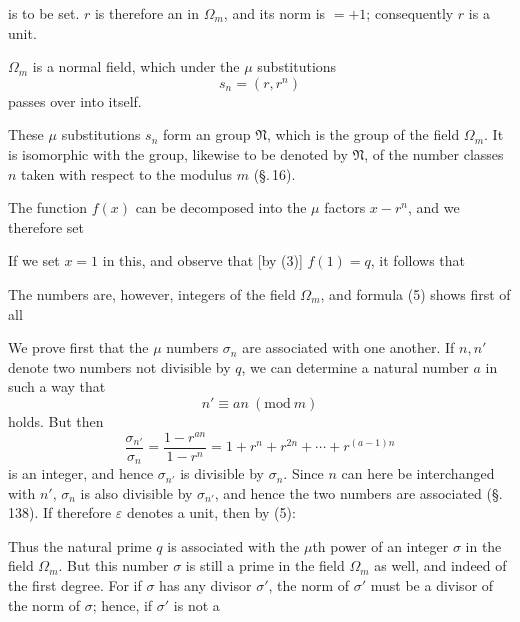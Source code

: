 is to be set. $r$ is therefore an  in $\Omega_m$, and its norm is $=+1$; consequently $r$ is a unit.

$\Omega_m$ is a normal field, which under the $\mu$ substitutions
\[ s_n = (r, r^n) \]
passes over into itself.

These $\mu$ substitutions $s_n$ form an  group $\mathfrak{N}$, which is the  group of the field $\Omega_m$. It is isomorphic with the group, likewise to be denoted by $\mathfrak{N}$, of the number classes $n$ taken with respect to the modulus $m$ (\S.\,16).

The function $f(x)$ can be decomposed into the $\mu$ factors $x - r^n$, and we therefore set

If we set $x=1$ in this, and observe that [by (3)] $f(1) = q$, it follows that

The numbers
are, however, integers of the field $\Omega_m$, and formula (5) shows first of all 

We prove first that the $\mu$ numbers $\sigma_n$ are associated with one another. If $n, n'$ denote two numbers not divisible by $q$, we can determine a natural number $a$ in such a way that
\[ n' \equiv a n \ (\mathrm{mod}\ m) \]
holds. But then
\[ \frac{\sigma_{n'}}{\sigma_n} = \frac{1 - r^{an}}{1 - r^n} = 1 + r^n + r^{2n} + \cdots + r^{(a-1)n} \]
is an integer, and hence $\sigma_{n'}$ is divisible by $\sigma_n$. Since $n$ can here be interchanged with $n'$, $\sigma_n$ is also divisible by $\sigma_{n'}$, and hence the two numbers are associated (\S.\,138). If therefore $\varepsilon$ denotes a unit, then by (5):

Thus the natural prime $q$ is associated with the $\mu$th power of an integer $\sigma$ in the field $\Omega_m$. But this number $\sigma$ is still a prime in the field $\Omega_m$ as well, and indeed of the first degree. For if $\sigma$ has any divisor $\sigma'$, the norm of $\sigma'$ must be a divisor of the norm of $\sigma$; hence, if $\sigma'$ is not a
